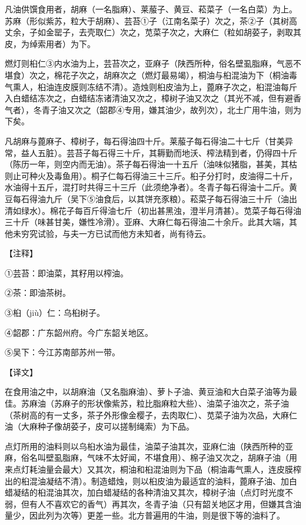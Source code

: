 \documentclass[12pt,UTF8]{ctexbook}
\begin{document}
凡油供馔食用者，胡麻（一名脂麻）、莱菔子、黄豆、菘菜子（一名白菜）为上。苏麻（形似紫苏，粒大于胡麻）、芸苔①子（江南名菜子）次之，茶②子（其树高丈余，子如金罂子，去壳取仁）次之，苋菜子次之，大麻仁（粒如胡荽子，剥取其皮，为绰索用者）为下。

燃灯则桕仁③内水油为上，芸苔次之，亚麻子（陕西所种，俗名壁虱脂麻，气恶不堪食）次之，棉花子次之，胡麻次之（燃灯最易竭），桐油与桕混油为下（桐油毒气熏人，桕油连皮膜则冻结不清）。造烛则桕皮油为上，蓖麻子次之，桕混油每斤入白蜡结冻次之，白蜡结冻诸清油又次之，樟树子油又次之（其光不减，但有避香气者），冬青子油又次之（韶郡④专用，嫌其油少，故列次），北土广用牛油，则为下矣。

凡胡麻与蓖麻子、樟树子，每石得油四十斤。莱菔子每石得油二十七斤（甘美异常，益人五脏）。芸苔子每石得三十斤，其耨勤而地沃、榨法精到者，仍得四十斤（陈历一年，则空内而无油）。茶子每石得油一十五斤（油味似猪脂，甚美，其枯则止可种火及毒鱼用）。桐子仁每石得油三十三斤。桕子分打时，皮油得二十斤，水油得十五斤，混打时共得三十三斤（此须绝净者）。冬青子每石得油十二斤。黄豆每石得油九斤（吴下⑤油食后，以其饼充豕粮）。菘菜子每石得油三十斤（油出清如绿水）。棉花子每百斤得油七斤（初出甚黑浊，澄半月清甚）。苋菜子每石得油三十斤（味甚甘美，嫌性冷滑）。亚麻、大麻仁每石得油二十余斤。此其大端，其他未穷究试验，与夫一方已试而他方未知者，尚有待云。

【注释】

①芸苔：即油菜，其籽用以榨油。

②茶：即油茶树。

③桕（jiù）仁：乌桕树子。

④韶郡：广东韶州府。今广东韶关地区。

⑤吴下：今江苏南部苏州一带。

【译文】

在食用油之中，以胡麻油（又名脂麻油）、萝卜子油、黄豆油和大白菜子油等为最佳。苏麻油（苏麻子的形状像紫苏，粒比脂麻粒大些）、油菜子油次之，茶子油（茶树高的有一丈多，茶子外形像金樱子，去肉取仁）、苋菜子油为次品，大麻仁油（大麻种子像胡荽子，皮可以搓制绳索）为下品。

点灯所用的油料则以乌桕水油为最佳，油菜子油其次，亚麻仁油（陕西所种的亚麻，俗名叫壁虱脂麻，气味不太好闻，不堪食用）、棉子油又次之，胡麻子油（用来点灯耗油量会最大）又其次，桐油和桕混油则为下品（桐油毒气熏人，连皮膜榨出的桕混油凝结不清）。制造蜡烛，则以桕皮油为最适宜的油料，蓖麻子油、加白蜡凝结的桕混油其次，加白蜡凝结的各种清油又其次，樟树子油（点灯时光度不弱，但有人不喜欢它的香气）再其次，冬青子油（只有韶关地区才用，但嫌其含油量少，因此列为次等）更差一些。北方普遍用的牛油，则是很下等的油料了。
\end{document}

